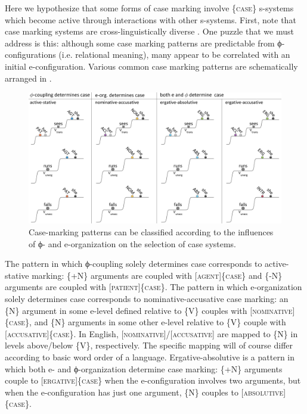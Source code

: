   Here we hypothesize that some forms of case marking involve \{\textsc{case}\} s-systems which become active through interactions with other s-systems. First, note that case marking systems are cross-linguistically diverse \citep{MalchukovSpencer2008}. One puzzle that we must address is this: although some case marking patterns are predictable from ϕ-configurations (i.e. relational meaning), many appear to be correlated with an initial e-configuration. Various common case marking patterns are schematically arranged in {}. 

  
\begin{figure}
\includegraphics[width=\textwidth]{figures/Tilsen-img70.png}
\caption{Case-marking patterns can be classified according to the influences of ϕ- and e-organization on the selection of case systems.}
\label{fig:4:20}
\end{figure}
 

  The pattern in which ϕ-coupling solely determines case corresponds to active-stative marking: \{+N\} arguments are coupled with [\textsc{agent}]\{\textsc{case}\} and \{-N\} arguments are coupled with [\textsc{patient}]\{\textsc{case}\}. The pattern in which e-organization solely determines case corresponds to nominative-accusative case marking: an \{N\} argument in some e-level defined relative to \{V\} couples with [\textsc{nominative}]\{\textsc{case}\}, and \{N\} arguments in some other e-level relative to \{V\} couple with [\textsc{accusative}]\{\textsc{case\}}. In English, [\textsc{nominative}]/[\textsc{accusative}] are mapped to \{N\} in levels above/below \{V\}, respectively. The specific mapping will of course differ according to basic word order of a language. Ergative-absolutive is a pattern in which both e- and ϕ-organization determine case marking: \{+N\} arguments couple to [\textsc{ergative}]\{\textsc{case}\} when the e-configuration involves two arguments, but when the e-configuration has just one argument, \{N\} couples to [\textsc{absolutive}]\{\textsc{case}\}.

